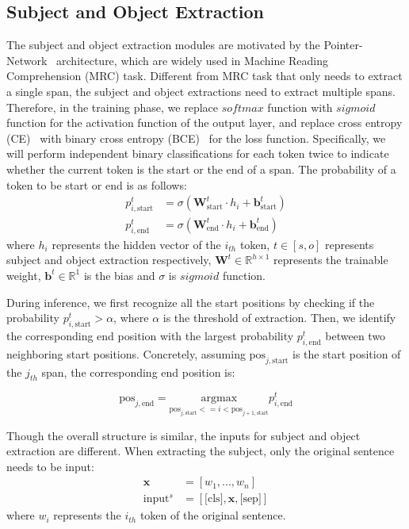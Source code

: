 \documentclass[11pt,a4paper]{article}
\begin{document}
\subsection{Subject and Object Extraction}
The subject and object extraction modules are motivated by the Pointer-Network~\cite{vinyals2015pointer} architecture, which are 
widely used in Machine Reading Comprehension (MRC) \cite{rajpurkar2016squad} task. Different from MRC task that only needs to extract a single span, the subject and object extractions need to extract multiple spans. Therefore, in the training phase, we replace $softmax$ function with $sigmoid$ function for the activation function of the output layer, and replace cross entropy (CE)~\cite{goodfellow2016deep} with binary cross entropy (BCE)~\cite{luc2016semantic} for the loss function. Specifically, we will perform independent binary classifications for each token twice to indicate whether the current token is the start or the end of a span. The probability of a token to be start or end is as follows:
\begin{align}
    p_{i,{\text{start}}}^t &= \sigma(\mathbf{W}_{\text{start}}^t \cdot h_i + \mathbf{b}_{\text{start}}^t) \\
    p_{i,{\text{end}}}^t &= \sigma(\mathbf{W}_{\text{end}}^t \cdot h_i + \mathbf{b}_\text{end}^t)
\end{align}
where $h_i$ represents the hidden vector of the $i_{th}$ token, $t \in [s, o]$ represents subject and object extraction respectively, $\mathbf{W}^{t} \in \mathbb{R}^{h \times 1}$ represents the trainable weight, $\mathbf{b}^{t} \in \mathbb{R}^1$ is the bias and $\sigma$ is $sigmoid$ function.

During inference, we first recognize all the start positions by checking if the probability $p_{i,{\text{start}}}^t > \alpha$, where $\alpha$ is the threshold of extraction. Then, we identify the corresponding end position with the largest probability $p_{i,{\text{end}}}^t$ between two neighboring start positions. Concretely, assuming $\text{pos}_{j, \text{start}}$ is the start position of the $j_{th}$ span, the corresponding end position is:

\begin{equation}
    \text{pos}_{j, \text{end}} = \underset{\text{pos}_{j, \text{start}} <= i < \text{pos}_{j+1, \text{start}}}{\mathrm{argmax}} p_{i,{\text{end}}}^t
\end{equation}

Though the overall structure is similar, the inputs for subject and object extraction are different. When extracting the subject, only the original sentence needs to be input:
\begin{align}
    \mathbf{x} &= [w_1, ..., w_n] \\
    \text{input}^s &= [\text{[cls]}, \mathbf{x}, \text{[sep]}]
\end{align}
where $w_i$ represents the $i_{th}$ token of the original sentence.
\end{document}
